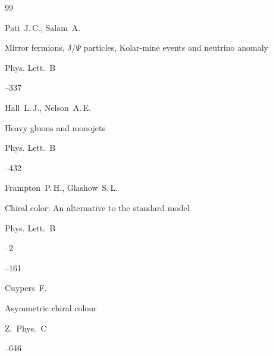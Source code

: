 \begin{thebibliography}{99}




\by Pati~J.\,C., Salam~A.

\paper Mirror fermions, J/$\Psi$ particles, Kolar-mine events and neutrino anomaly

\jour Phys. Lett.~B




--337





\by Hall~L.\,J., Nelson~A.\,E.

\paper Heavy gluons and monojets 

\jour Phys. Lett.~B




--432





\by Frampton~P.\,H., Glashow~S.\,L.

\paper Chiral color: An alternative to the standard model

\jour Phys. Lett.~B



--2

--161





\by Cuypers~F.

\paper Asymmetric chiral colour 

\jour Z.~Phys.~C




--646





\end{thebibliography}
